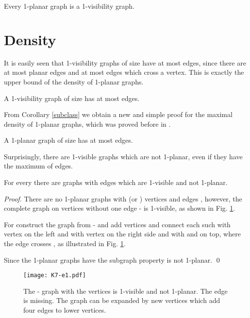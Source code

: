 \documentclass[runningheads]{llncs}
\begin{document}
\begin{corollary} \label{subclass}
Every 1-planar graph is a  1-visibility graph.
\end{corollary}

\section{Density}

It is easily seen that 1-visibility graphs of size  have at most
 edges, since there are at most  planar edges and at
most  edges which cross a vertex. This is exactly the upper
bound of the density of 1-planar graphs.



\begin{corollary}
A 1-visibility graph of size  has at most  edges.
\end{corollary}

From Corollary \ref{subclass} we obtain a new and simple proof for
the maximal density of 1-planar graphs, which was proved before in
\cite{bhw-bs-83,pt-gdfce-97,fm-s1pg-07}.

\begin{corollary}
A 1-planar graph  of size  has at most  edges.
\end{corollary}


Surprisingly, there are 1-visible graphs which are not 1-planar,
even if they have the maximum of  edges.

\begin{theorem}
For every  there are graphs with  edges which are
1-visible and not 1-planar.
\end{theorem}

\begin{proof}
There are no 1-planar graphs with  (or ) vertices and
 edges \cite{bhw-1og-84,s-rm1pg-10}, however, the complete
graph on  vertices without one edge - is 1-visible, as
shown in Fig. \ref{fig:K7-e}.

For  construct the graph   from - and add
 vertices and connect each such  with vertex  on the
left and with vertex  on the right side and with  and
 on top, where the edge  crosses ,
as illustrated in Fig. \ref{fig:K7-e}.

Since the 1-planar graphs have the subgraph property   is not
1-planar.
 \qed
\end{proof}

\begin{figure}
   \begin{center}
  \texttt{[image: K7-e1.pdf]}
     \caption{The - graph with the vertices  is 1-visible and not 1-planar.
     The edge  is missing. The graph can be expanded by new vertices  which add four edges
     to lower vertices.}
     \label{fig:K7-e}
   \end{center}
\end{figure}
\end{document}
